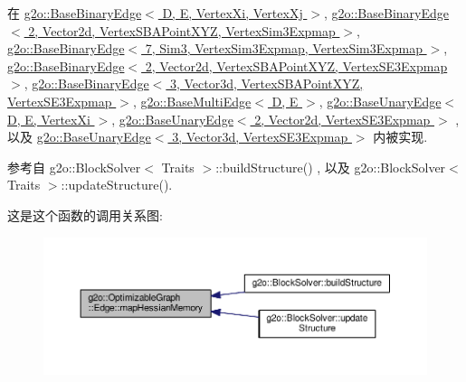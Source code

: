 在 \hyperlink{classg2o_1_1BaseBinaryEdge_ada358930854d386a4e8c32f64078e052}{g2o\-::\-Base\-Binary\-Edge$<$ D, E, Vertex\-Xi, Vertex\-Xj $>$}, \hyperlink{classg2o_1_1BaseBinaryEdge_ada358930854d386a4e8c32f64078e052}{g2o\-::\-Base\-Binary\-Edge$<$ 2, Vector2d, Vertex\-S\-B\-A\-Point\-X\-Y\-Z, Vertex\-Sim3\-Expmap $>$}, \hyperlink{classg2o_1_1BaseBinaryEdge_ada358930854d386a4e8c32f64078e052}{g2o\-::\-Base\-Binary\-Edge$<$ 7, Sim3, Vertex\-Sim3\-Expmap, Vertex\-Sim3\-Expmap $>$}, \hyperlink{classg2o_1_1BaseBinaryEdge_ada358930854d386a4e8c32f64078e052}{g2o\-::\-Base\-Binary\-Edge$<$ 2, Vector2d, Vertex\-S\-B\-A\-Point\-X\-Y\-Z, Vertex\-S\-E3\-Expmap $>$}, \hyperlink{classg2o_1_1BaseBinaryEdge_ada358930854d386a4e8c32f64078e052}{g2o\-::\-Base\-Binary\-Edge$<$ 3, Vector3d, Vertex\-S\-B\-A\-Point\-X\-Y\-Z, Vertex\-S\-E3\-Expmap $>$}, \hyperlink{classg2o_1_1BaseMultiEdge_aecded66022b967fab0deb1c6a2d76445}{g2o\-::\-Base\-Multi\-Edge$<$ D, E $>$}, \hyperlink{classg2o_1_1BaseUnaryEdge_a919dcb89130f6e7082e807530facdd78}{g2o\-::\-Base\-Unary\-Edge$<$ D, E, Vertex\-Xi $>$}, \hyperlink{classg2o_1_1BaseUnaryEdge_a919dcb89130f6e7082e807530facdd78}{g2o\-::\-Base\-Unary\-Edge$<$ 2, Vector2d, Vertex\-S\-E3\-Expmap $>$} , 以及 \hyperlink{classg2o_1_1BaseUnaryEdge_a919dcb89130f6e7082e807530facdd78}{g2o\-::\-Base\-Unary\-Edge$<$ 3, Vector3d, Vertex\-S\-E3\-Expmap $>$} 内被实现.



参考自 g2o\-::\-Block\-Solver$<$ Traits $>$\-::build\-Structure() , 以及 g2o\-::\-Block\-Solver$<$ Traits $>$\-::update\-Structure().



这是这个函数的调用关系图\-:
\nopagebreak
\begin{figure}[H]
\begin{center}
\leavevmode
\includegraphics[width=350pt]{classg2o_1_1OptimizableGraph_1_1Edge_a3bd233fd552daa166039acf47b69a5a7_icgraph}
\end{center}
\end{figure}


